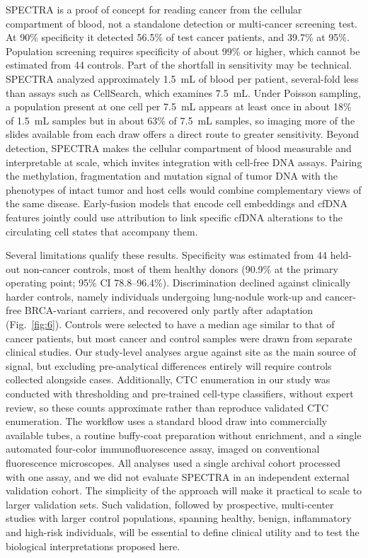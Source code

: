 \documentclass[11pt]{article}
\begin{document}
SPECTRA is a proof of concept for reading cancer from the cellular compartment of blood, not a standalone detection or multi-cancer screening test. At 90\% specificity it detected 56.5\% of test cancer patients, and 39.7\% at 95\%. Population screening requires specificity of about 99\% or higher\cite{liu2020,klein2021}, which cannot be estimated from 44 controls. Part of the shortfall in sensitivity may be technical. SPECTRA analyzed approximately 1.5~mL of blood per patient, several-fold less than assays such as CellSearch, which examines 7.5~mL\cite{allard2004}. Under Poisson sampling\cite{tibbe2007}, a population present at one cell per 7.5~mL appears at least once in about 18\% of 1.5~mL samples but in about 63\% of 7.5~mL samples, so imaging more of the slides available from each draw offers a direct route to greater sensitivity. Beyond detection, SPECTRA makes the cellular compartment of blood measurable and interpretable at scale, which invites integration with cell-free DNA assays\cite{bettegowda2014,liu2020,cristiano2019,cohen2018}. Pairing the methylation, fragmentation and mutation signal of tumor DNA with the phenotypes of intact tumor and host cells would combine complementary views of the same disease. Early-fusion models that encode cell embeddings and cfDNA features\cite{bettegowda2014,liu2020,cristiano2019,cohen2018} jointly could use attribution to link specific cfDNA alterations to the circulating cell states that accompany them.

Several limitations qualify these results. Specificity was estimated from 44 held-out non-cancer controls, most of them healthy donors (90.9\% at the primary operating point; 95\% CI 78.8--96.4\%). Discrimination declined against clinically harder controls, namely individuals undergoing lung-nodule work-up and cancer-free BRCA-variant carriers, and recovered only partly after adaptation (Fig.~\ref{fig:6}). Controls were selected to have a median age similar to that of cancer patients, but most cancer and control samples were drawn from separate clinical studies. Our study-level analyses argue against site as the main source of signal, but excluding pre-analytical differences entirely will require controls collected alongside cases. Additionally, CTC enumeration in our study was conducted with thresholding and pre-trained cell-type classifiers, without expert review, so these counts approximate rather than reproduce validated CTC enumeration. The workflow uses a standard blood draw into commercially available tubes, a routine buffy-coat preparation without enrichment, and a single automated four-color immunofluorescence assay, imaged on conventional fluorescence microscopes. All analyses used a single archival cohort processed with one assay, and we did not evaluate SPECTRA in an independent external validation cohort. The simplicity of the approach will make it practical to scale to larger validation sets. Such validation, followed by prospective, multi-center studies with larger control populations, spanning healthy, benign, inflammatory and high-risk individuals, will be essential to define clinical utility and to test the biological interpretations proposed here.
\end{document}
